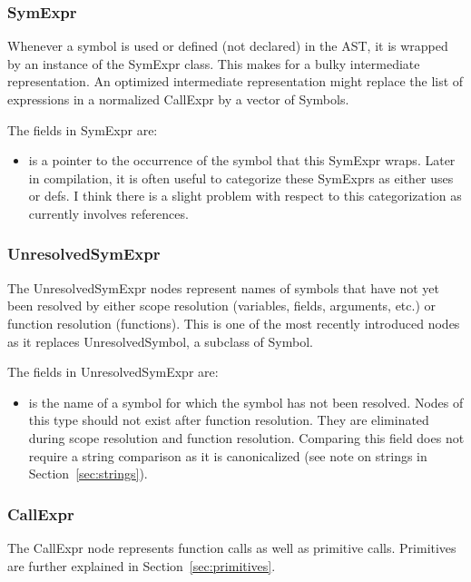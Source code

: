 \documentclass[10pt]{article}
\begin{document}
\subsubsection{SymExpr}
\label{sec:symexpr}

Whenever a symbol is used or defined (not declared) in the AST, it is
wrapped by an instance of the SymExpr class.  This makes for a bulky
intermediate representation.  An optimized intermediate representation
might replace the list of expressions in a normalized CallExpr by a
vector of Symbols.

The fields in SymExpr are:
\begin{itemize}
\item {} is a pointer to the occurrence of the symbol
  that this SymExpr wraps.  Later in compilation, it is often useful
  to categorize these SymExprs as either uses or defs.  I think there
  is a slight problem with respect to this categorization as currently
  involves references.
\end{itemize}

\subsubsection{UnresolvedSymExpr}
\label{sec:unresolvedsymexpr}

The UnresolvedSymExpr nodes represent names of symbols that have not
yet been resolved by either scope resolution (variables, fields,
arguments, etc.) or function resolution (functions).  This is one of
the most recently introduced nodes as it replaces UnresolvedSymbol, a
subclass of Symbol.

The fields in UnresolvedSymExpr are:
\begin{itemize}
\item {} is the name of a symbol for which
  the symbol has not been resolved.  Nodes of this type should not
  exist after function resolution.  They are eliminated during scope
  resolution and function resolution.  Comparing this field does not
  require a string comparison as it is canonicalized (see note on
  strings in Section~\ref{sec:strings}).
\end{itemize}

\subsubsection{CallExpr}
\label{sec:callexpr}

The CallExpr node represents function calls as well as primitive
calls.  Primitives are further explained in
Section~\ref{sec:primitives}.
\end{document}
